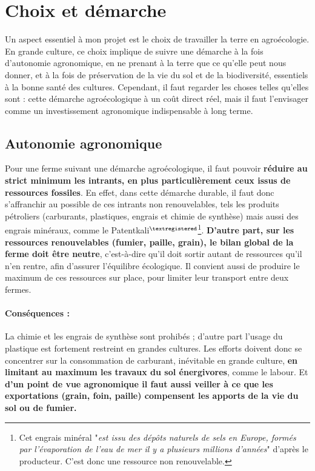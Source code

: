\documentclass{book}
\begin{document}
\section{Choix et démarche}

Un aspect essentiel à mon projet est le choix de travailler la terre en agroécologie. En grande culture, ce choix implique de suivre une démarche à la fois d'autonomie agronomique, en ne prenant à la terre que ce qu'elle peut nous donner, et à la fois de préservation de la vie du sol et de la biodiversité, essentiels à la bonne santé des cultures. Cependant, il faut regarder les choses telles qu'elles sont : cette démarche agroécologique à un coût direct réel, mais il faut l'envisager comme un investissement agronomique indispensable à long terme.

\subsection{Autonomie agronomique}

Pour une ferme suivant une démarche agroécologique, il faut pouvoir \textbf{réduire au strict minimum les intrants, en plus particulièrement ceux issus de ressources fossiles}. En effet, dans cette démarche durable, il faut donc s'affranchir au possible de ces intrants non renouvelables, tels les produits pétroliers (carburants, plastiques, engrais et chimie de synthèse) mais aussi des engrais minéraux, comme le Patentkali$^\mathrm{\textregistered}$\footnote{Cet engrais minéral "\textit{est issu des dépôts naturels de sels en Europe, formés par l’évaporation de l’eau de mer il y a plusieurs millions d’années}" d'après le producteur. C'est donc une ressource non renouvelable.}. \textbf{D'autre part, sur les ressources renouvelables (fumier, paille, grain), le bilan global de la ferme doit être neutre}, c'est-à-dire qu'il doit sortir autant de ressources qu'il n'en rentre, afin d'assurer l'équilibre écologique. Il convient aussi de produire le maximum de ces ressources sur place, pour limiter leur transport entre deux fermes.

\paragraph{Conséquences :} La chimie et les engrais de synthèse sont prohibés ; d'autre part l'usage du plastique est fortement restreint en grandes cultures. Les efforts doivent donc se concentrer sur la consommation de carburant, inévitable en grande culture, \textbf{en limitant au maximum les travaux du sol énergivores}, comme le labour. Et \textbf{d'un point de vue agronomique il faut aussi veiller à ce que les exportations (grain, foin, paille) compensent les apports de la vie du sol ou de fumier.}
\end{document}
